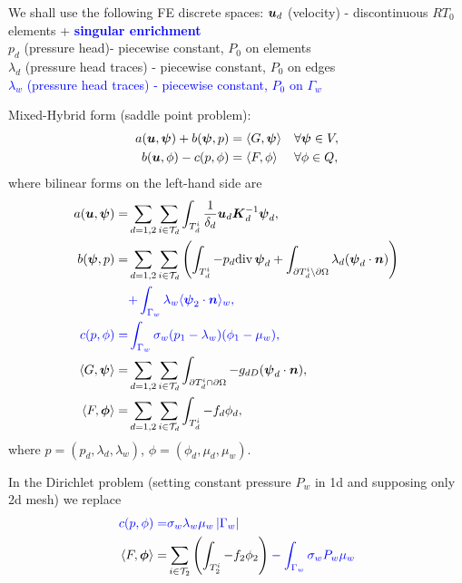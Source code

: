   
  We shall use the following FE discrete spaces:
  $\mathbf{\boldsymbol{u}}_d$ (velocity) - discontinuous $RT_0$ elements + \textcolor{blue}{\bf singular enrichment}\\
  $p_d$ (pressure head)- piecewise constant, $P_0$ on elements \\
  $\lambda_d$ (pressure head traces) - piecewise constant, $P_0$ on edges \\
  \textcolor{blue}{$\lambda_w$ (pressure head traces) - piecewise constant, $P_0$ on $\Gamma_w$}
  
  
  Mixed-Hybrid form (saddle point problem): 
\begin{align}
        \label{Saddle1}
 a(\mathbf{\boldsymbol{u}},\mathbf{\boldsymbol{\psi}}) + b(\mathbf{\boldsymbol{\psi}}, p) &= \langle G, \mathbf{\boldsymbol{\psi}}\rangle &&\forall 
\mathbf{\boldsymbol{\psi}}\in V,\\
        \label{Saddle2}
 b(\mathbf{\boldsymbol{u}}, \phi) - c(p,\phi) &= \langle F, \phi \rangle &&\forall \phi \in Q,
\end{align}
where bilinear forms on the left-hand side are
\begin{align*}
 a(\vc u, \vc \psi)=&\sum_{d=1,2}\sum_{i\in \mathcal T_d} \int_{T_d^i}
   \frac{1}{\delta_d} \vc u_d \vc K_d^{-1} \vc \psi_d,\\
%
 b(\vc \psi, p)=&\sum_{d=1,2}\sum_{i\in \mathcal T_d} 
        \left(
        \int_{T_d^i} -p_d\div\,\vc \psi_d
        +\int_{\prtl T_d^i\setminus \prtl\Omega}
                 \lambda_d (\vc \psi_d \cdot \vc n)
        \right) \\
        &\color{blue}{
            + \int_{\Gamma_w} \lambda_w \avg{\vc \psi_2 \cdot \vc n}_w},\\
%
\color{blue}
 c(p,\phi) =& \color{blue}
          \int_{\Gamma_w}
               \sigma_w(p_{1}-\lambda_w)(\phi_{1}-\mu_w),\\
 \langle G, \vc \psi\rangle =& \sum_{d=1,2}\sum_{i\in \mathcal T_d}
        \int_{\prtl T_d^i\cap \prtl\Omega}
                 - g_{dD} (\vc \psi_d \cdot \vc n),\\
 \langle F, \vc \phi\rangle =& \sum_{d=1,2}\sum_{i\in \mathcal T_d}
        \int_{T_d^i} - f_d \phi_d,
\end{align*}
where $p=(p_d,\lambda_d, \lambda_w)$, $\phi=(\phi_d,\mu_d, \mu_w)$.

In the Dirichlet problem (setting constant pressure $P_w$ in 1d and supposing only 2d mesh) we replace
\begin{align*}
\color{blue}
c(p,\phi) =& \color{blue} \sigma_w\lambda_w\mu_w\left|\Gamma_w\right| \\
\langle F, \mathbf{\boldsymbol{\phi}}\rangle =& \sum_{i\in \mathcal T_2}
        \left(\int_{T_2^i} - f_2 \phi_2\right) \color{blue} -{\int_{\Gamma_w}\sigma_w P_w \mu_w}
\end{align*}




















